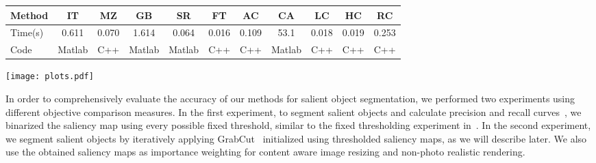 \documentclass[10pt,twocolumn,letterpaper]{article}
\newcommand{\IT}{IT\cite{98pami/Itti}}
\newcommand{\MZ}{MZ\cite{03ACMMM/Ma_Contrast-based}}
\newcommand{\GB}{GB\cite{conf/nips/HarelKP06}}
\newcommand{\SR}{SR\cite{07cvpr/hou_SpectralResidual}}
\newcommand{\FT}{FT\cite{09cvpr/Achanta_FTSaliency}}
\newcommand{\CA}{CA\cite{10cvpr/goferman_context}}
\newcommand{\LC}{LC\cite{06acmmm/ZhaiS_spatiotemporal}}
\newcommand{\AC}{AC\cite{08cvs/achanta_salient}}
\newcommand{\vnudge}{\vspace*{-.1in}}
\begin{document}
\begin{table*}
    \centering
    \begin{tabular}{l|c|c|c|c|c|c|c|c|c|c} \hline\hline
      Method  &  \IT   &  \MZ  &   \GB  &  \SR   &  \FT  &  \AC  &  \CA   & \LC   &  HC   &  RC   \\ \hline
      Time(s) & 0.611  & 0.070 & 1.614  & 0.064  & 0.016 & 0.109 &  53.1  & 0.018 & 0.019 & 0.253 \\ \hline
      Code    & Matlab & C++   & Matlab & Matlab &  C++  &  C++  & Matlab &  C++  &  C++  &  C++  \\ \hline\hline
    \end{tabular}
    \caption{Average time taken to compute a saliency map for images in the database
        by Achanta et al.~\cite{09cvpr/Achanta_FTSaliency}. Most images in the
        database~(see our project webpage) have resolution $400\times300$.
        Algorithms were tested using a Dual Core 2.6 GHz machine with 2GB RAM.
    } \label{tab:TimeEfficency}
\end{table*}


\begin{figure*}
  \centering
  \texttt{[image: plots.pdf]}
  \caption{Precision-recall curves for naive thresholding of saliency maps
    using 1000 publicly available benchmark images. (Left, middle)~Different options
    of our method compared with \GB, \MZ,  \FT, \IT, \SR, \AC, \CA, and \LC.
    NHC denotes a naive version of our HC method with color space smoothing disabled, and
    NRC denotes our RC method with spatial related weighting disabled.
    (Right)~Precision-recall bars for our saliency cut algorithm using
    different saliency maps as initialization. Our method RC shows high
    precision, recall, and $F_{\beta}$ values over the 1000-image database. (Please refer to
    our project webpage for the respective result images.)
  } \label{fig:plots} \vnudge
\end{figure*}

In order to comprehensively evaluate the accuracy of our methods for salient object
segmentation, we performed two experiments using different objective comparison measures.
%
In the first experiment, to segment salient objects and calculate precision and recall
curves~\cite{07cvpr/hou_SpectralResidual}, we binarized the saliency map using every possible fixed
threshold, similar to the fixed thresholding experiment in~\cite{09cvpr/Achanta_FTSaliency}.
%
In the second experiment, we segment salient objects by iteratively applying
GrabCut~\cite{04tog/rother_grabcut} initialized using thresholded saliency maps, as we will describe later.
%
We also use the obtained saliency maps as importance weighting for content aware image
resizing and non-photo realistic rendering.
\end{document}
